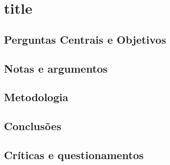 \documentclass[./../main.tex]{subfiles}
\begin{document}
\setcounter{secnumdepth}{1}

\frenchspacing
\onehalfspacing

\setlength{\parindent}{1em} %
\setlength{\parskip}{1em} %

\section{title}

\subsection{Perguntas Centrais e Objetivos}

\subsection{Notas e argumentos}

\subsection{Metodologia}

\subsection{Conclusões}

\subsection{Críticas e questionamentos}

\printbibliography
\end{document}
